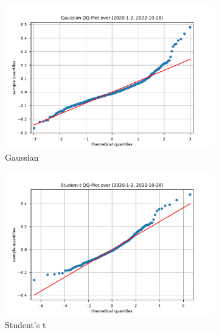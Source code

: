 \begin{figure}[htbp]
    \centering
    \begin{subfigure}[b]{0.32\textwidth}
        \centering
        \includegraphics[width=\textwidth]{content/reschap4/Figures/gauss_QQ_2020-1-2-2022-10-28.pdf}
        \caption{\small Gaussian}
    \end{subfigure}
    \hfill
    \begin{subfigure}[b]{0.32\textwidth}
        \centering
        \includegraphics[width=\textwidth]{content/reschap4/Figures/student_QQ_2020-1-2-2022-10-28.pdf}
        \caption{\small Student's t}
    \end{subfigure}
    \hfill
    \begin{subfigure}[b]{0.32\textwidth}
        \centering

\end{subfigure}
\end{figure}
